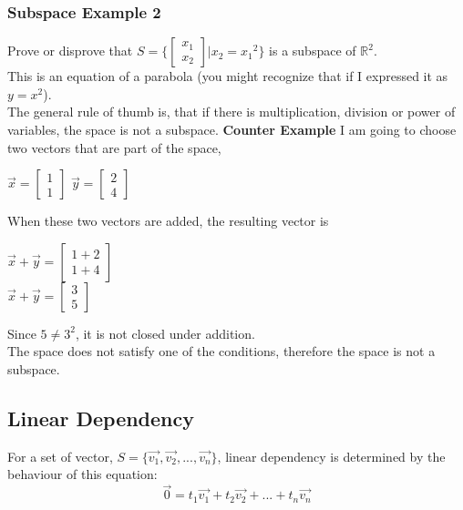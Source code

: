\documentclass[12pt]{article}
\newcommand{\R}{\mathbb{R}}
\begin{document}
\subsubsection{Subspace Example 2}
Prove or disprove that $S=\{\begin{bmatrix}x_1\\x_2\end{bmatrix} | x_2 = {x_1}^2\}$ is a subspace of $\R^2$.\\
This is an equation of a parabola (you might recognize that if I expressed it as $y=x^2$).\\
The general rule of thumb is, that if there is multiplication, division or power of variables, the space is not a subspace.
\textbf{Counter Example}
I am going to choose two vectors that are part of the space,\\
\begin{centering}
$\vec{x} = \begin{bmatrix}1\\1\end{bmatrix}$
$\vec{y} = \begin{bmatrix}2\\4\end{bmatrix}$\\
\end{centering}
When these two vectors are added, the resulting vector is 
\begin{centering}
$\vec{x}+\vec{y} = \begin{bmatrix}1+2\\1+4\end{bmatrix}$\\
$\vec{x}+\vec{y} = \begin{bmatrix}3\\5\end{bmatrix}$\\
\end{centering}
Since $5\neq3^2$, it is not closed under addition.\\
The space does not satisfy one of the conditions, therefore the space is not a subspace.

\subsection{Linear Dependency}
For a set of vector, $S = \{\vec{v_1},\vec{v_2},...,\vec{v_n}\}$, linear dependency is determined by the behaviour of this equation:
\begin{equation}
\label{eq:Lin}
\vec{0} = t_1\vec{v_1} + t_2\vec{v_2} + ... +t_n\vec{v_n}
\end{equation}
\end{document}
